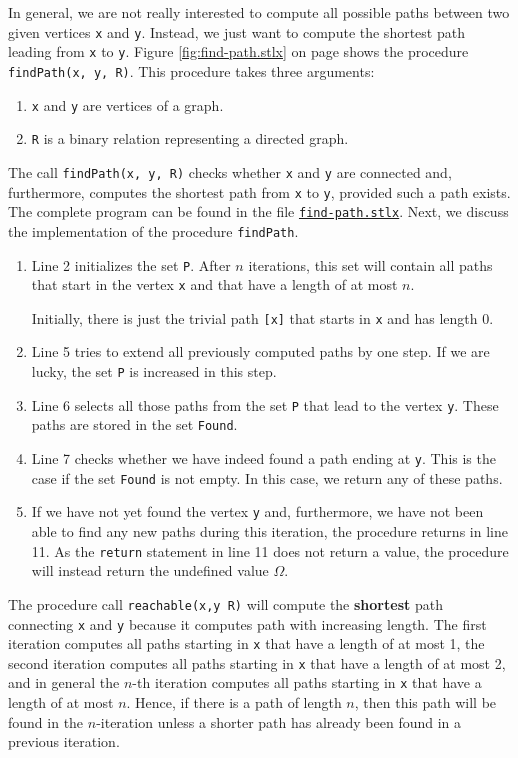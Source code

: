 In general, we are not really interested to compute all possible paths between two given vertices
\texttt{x} and \texttt{y}.  Instead, we just want to compute the shortest path leading from \texttt{x} to \texttt{y}.
Figure \ref{fig:find-path.stlx} on page \pageref{fig:find-path.stlx} shows the procedure \texttt{findPath(x, y, R)}. 
This procedure takes three arguments:
\begin{enumerate}
\item \texttt{x} and \texttt{y} are vertices of a graph.
\item \texttt{R} is a binary relation representing a directed graph.
\end{enumerate}
The call  \texttt{findPath(x, y, R)} checks whether \texttt{x} and \texttt{y} are connected and, furthermore,
computes the shortest path from \texttt{x} to \texttt{y}, provided such a path exists.
The complete program can be found in the file
\href{https://github.com/karlstroetmann/Logik/blob/master/SetlX/find-path.stlx}{\texttt{find-path.stlx}}.
Next, we discuss the implementation of the procedure  \texttt{findPath}.
\begin{enumerate}
\item Line 2 initializes the set \texttt{P}.  After $n$ iterations, this set will contain all paths
      that start in the vertex \texttt{x} and that have a length of at most $n$.

      Initially, there is just the trivial path \texttt{[x]} that starts in \texttt{x} and has
      length $0$.
\item Line 5 tries to extend all previously computed paths by one step.
      If we are lucky, the set \texttt{P} is increased in this step.
\item Line 6 selects all those paths from the set \texttt{P} that lead to the vertex \texttt{y}.
      These paths are stored in the set \texttt{Found}.
\item Line 7 checks whether we have indeed found a path ending at \texttt{y}.  This is the case if
      the set \texttt{Found} is not empty.  
      In this case, we return any of these paths.
\item If we have not yet found the vertex \texttt{y} and, furthermore, we have not been able to find
      any new paths during this iteration,  the procedure returns in line 11.
      As the \texttt{return} statement in line 11 does not return a value, the procedure will
      instead return the undefined value $\Omega$.
\end{enumerate}
The procedure call \texttt{reachable(x,y R)} will compute the \textbf{shortest} path connecting
\texttt{x} and \texttt{y} because it computes path with increasing length.  The first iteration
computes all paths starting in \texttt{x} that have a length of at most 1, the second iteration
computes all paths starting in \texttt{x} that have a length of at most 2, and in general the $n$-th
iteration computes all paths starting in \texttt{x} that have a length of at most $n$.  Hence, if
there is a path of length $n$, then this path will be found in the $n$-iteration unless a shorter path has
already been found in a previous iteration.  

